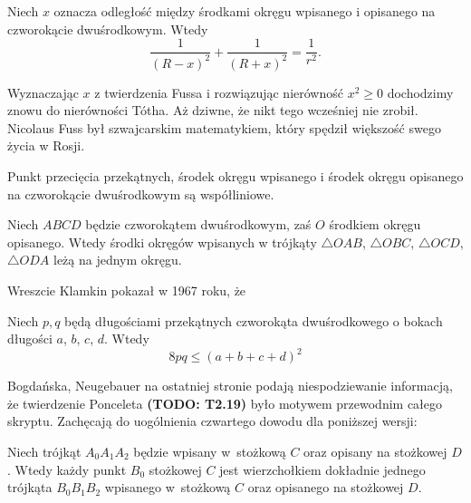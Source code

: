 \begin{theorem}[Fussa, 1792]
	Niech $x$ oznacza odległość między środkami okręgu wpisanego i opisanego na czworokącie dwuśrodkowym.
	Wtedy
	\begin{equation}
		\frac{1}{(R-x)^2} + \frac{1}{(R+x)^2} = \frac{1}{r^2}.
	\end{equation}
\end{theorem}

Wyznaczając $x$ z twierdzenia Fussa i rozwiązując nierówność $x^2 \ge 0$ dochodzimy znowu do nierówności Tótha.
Aż dziwne, że nikt tego wcześniej nie zrobił.
Nicolaus Fuss był szwajcarskim matematykiem, który spędził większość swego życia w Rosji.

\begin{proposition}
	Punkt przecięcia przekątnych, środek okręgu wpisanego i środek okręgu opisanego na czworokącie dwuśrodkowym są współliniowe.
\end{proposition}

\begin{proposition}
	Niech $ABCD$ będzie czworokątem dwuśrodkowym, zaś $O$ środkiem okręgu opisanego.
	Wtedy środki okręgów wpisanych w trójkąty $\triangle OAB$, $\triangle OBC$, $\triangle OCD$, $\triangle ODA$ leżą na jednym okręgu.
\end{proposition}

Wreszcie Klamkin pokazał w 1967 roku, że
\begin{proposition}
    Niech $p, q$ będą długościami przekątnych czworokąta dwuśrodkowego o bokach długości $a$, $b$, $c$, $d$.
    Wtedy
    \begin{equation}
        8 pq \le (a + b + c + d)^2
    \end{equation}
\end{proposition}





Bogdańska, Neugebauer \cite[s. 267]{neugebauer_2018} na ostatniej stronie podają niespodziewanie informacją, że twierdzenie Ponceleta {\color{red}\textbf{(TODO: T2.19)}\color{black}} było motywem przewodnim całego skryptu.
Zachęcają do uogólnienia czwartego dowodu dla poniższej wersji:

\begin{theorem}
	Niech trójkąt $A_0 A_1 A_2$ będzie wpisany w~stożkową $C$ oraz opisany na stożkowej $D$.
	Wtedy każdy punkt $B_0$ stożkowej $C$ jest wierzchołkiem dokładnie jednego trójkąta $B_0 B_1 B_2$ wpisanego w~stożkową $C$ oraz opisanego na stożkowej $D$.
\end{theorem}


